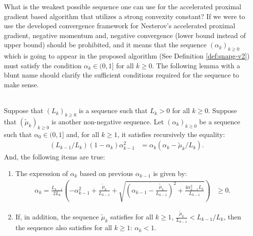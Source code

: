\documentclass[12pt]{article}
\begin{document}
        What is the weakest possible sequence one can use for the accelerated proximal gradient based algorithm that utilizes a strong convexity constant? 
        If we were to use the developed convergence framework for Nesterov's accelerated proximal gradient, negative momentum and, negative convergence (lower bound instead of upper bound) should be prohibited, and it means that the sequence $(\alpha_k)_{k \ge 0}$ which is going to appear in the proposed algorithm (See Definition \ref{def:snapg-v2}) must satisfy the condition $\alpha_k \in (0, 1]$ for all $k \ge 0$. 
        The following lemma with a blunt name should clarify the sufficient conditions required for the sequence to make sense. 
        \begin{lemma}\;\label{lemma:snapg-v2-seq-range}\\
            Suppose that $(L_k)_{k \ge 0}$ is a sequence such that $L_k > 0$ for all $k \ge 0$. 
            Suppose that $(\tilde\mu_k)_{k\ge 0}$ is another non-negative sequence. 
            Let $(\alpha_k)_{k \ge 0}$ be a sequence such that $\alpha_0 \in (0, 1]$ and, for all $k \ge 1$, it satisfies recursively the equality: 
            \begin{align*}
                (L_{k - 1}/L_k)(1 - \alpha_{k})\alpha_{k - 1}^2 
                &= \alpha_{k}\left(\alpha_{k} - \tilde \mu_k/L_k\right). 
            \end{align*}
            And, the following items are true: 
            \begin{enumerate}
                \item The expression of $\alpha_k$ based on previous $\alpha_{k - 1}$ is given by: 
                \begin{align*}
                    \alpha_k = \frac{L_{k - 1}}{2L_k} \left(
                        - \alpha_{k - 1}^2 + \frac{\tilde\mu_k}{L_{k - 1}}
                        + \sqrt{
                            \left(
                                \alpha_{k - 1} - \frac{\tilde\mu_k}{L_{k - 1}}
                            \right)^2
                            + \frac{4\alpha_{k - 1}^2L_k}{L_{k - 1}}
                        }
                    \right) &\ge 0. 
                \end{align*}
                \item If, in addition, the sequence $\tilde \mu_k$ satisfies for all $k \ge 1$, $\frac{\tilde \mu_k}{L_{k - 1}} < L_{k - 1}/ L_k$, then the sequence also satisfies for all $k \ge 1$: $\alpha_k < 1$. 
            \end{enumerate}
        \end{lemma}
\end{document}
